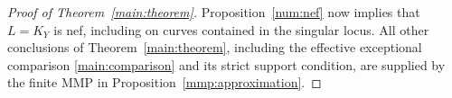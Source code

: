 \begin{proof}[Proof of Theorem~\ref{main:theorem}]
Proposition~\ref{num:nef} now implies that \(L=K_Y\) is nef, including on curves contained in the singular locus. All other conclusions of Theorem~\ref{main:theorem}, including the effective exceptional comparison \eqref{main:comparison} and its strict support condition, are supplied by the finite MMP in Proposition~\ref{mmp:approximation}.
\end{proof}
